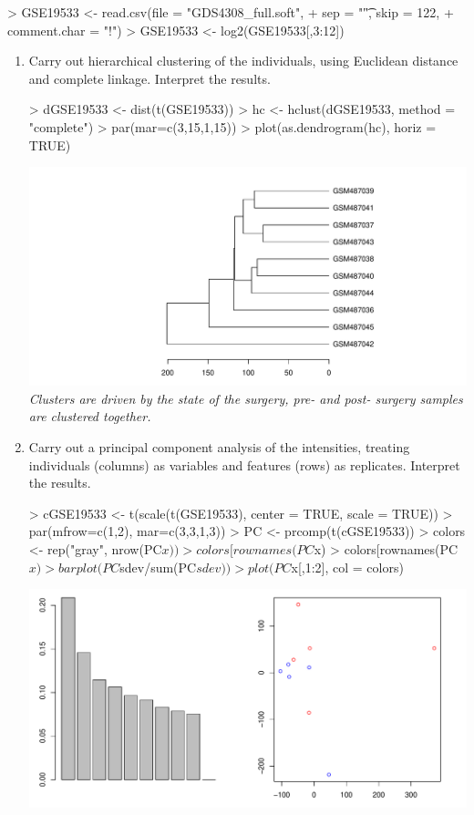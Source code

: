 \documentclass[12pt,a4paper]{paper}
\begin{document}
\begin{enumerate}
\begin{Schunk}
\begin{Sinput}
> GSE19533 <- read.csv(file = "GDS4308_full.soft", 
+                      sep = "\t", skip = 122, 
+                      comment.char = "!")
> GSE19533 <- log2(GSE19533[,3:12])
\end{Sinput}
\end{Schunk}
\begin{enumerate}
\item Carry out hierarchical clustering of the individuals, using Euclidean distance and complete linkage. Interpret the results.
\begin{Schunk}
\begin{Sinput}
> dGSE19533 <- dist(t(GSE19533))
> hc <- hclust(dGSE19533, method = "complete")
> par(mar=c(3,15,1,15))
> plot(as.dendrogram(hc), horiz = TRUE)
\end{Sinput}
\end{Schunk}
\includegraphics{Osorio_Daniel_HW2-007}
\\\textit{Clusters are driven by the state of the surgery, pre- and post- surgery samples are clustered together.}
\item Carry out a principal component analysis of the intensities, treating individuals (columns)
as variables and features (rows) as replicates. Interpret the results.
\begin{Schunk}
\begin{Sinput}
> cGSE19533 <- t(scale(t(GSE19533), center = TRUE, scale = TRUE))
> par(mfrow=c(1,2), mar=c(3,3,1,3))
> PC <- prcomp(t(cGSE19533))
> colors <- rep("gray", nrow(PC$x))
> colors[rownames(PC$x) %
> colors[rownames(PC$x) %
> barplot(PC$sdev/sum(PC$sdev))
> plot(PC$x[,1:2], col = colors)
\end{Sinput}
\end{Schunk}
\includegraphics{Osorio_Daniel_HW2-008}

\end{enumerate}
\end{enumerate}
\end{document}
